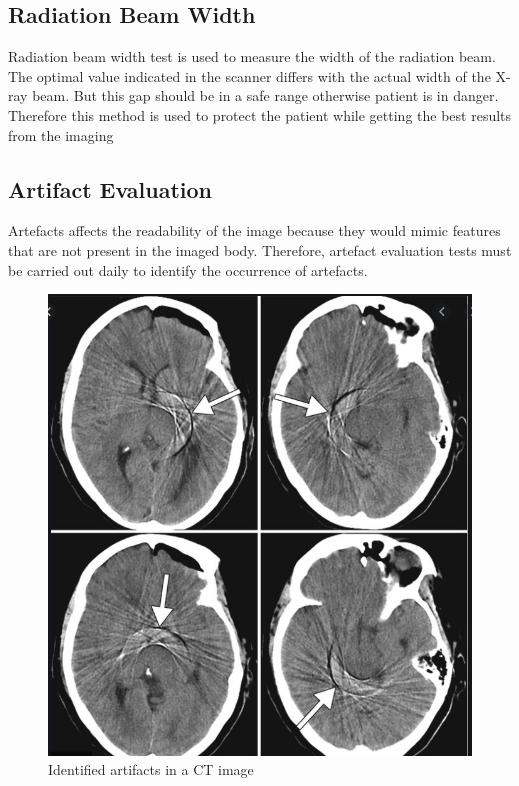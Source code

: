 \documentclass[12pt]{article}
\begin{document}
\subsection{Radiation Beam Width}
Radiation beam width test is used to measure the width of the radiation beam. The optimal value indicated in the scanner differs with the actual width of the X-ray beam. But this gap should be in a safe range otherwise patient is in danger. Therefore this method is used to protect the patient while getting the best results from the imaging

\subsection{Artifact Evaluation}
Artefacts affects the readability of  the image because they would mimic features that are not present in the imaged body. Therefore, artefact evaluation tests must be carried out daily to identify the occurrence of artefacts.

\begin{figure}[h!]
  \centering
  \includegraphics[width=0.75\linewidth]{ar.jpg}
  \caption{\small{Identified artifacts in a CT image}}
  \label{fig:Identified artifacts in a CT image}
\end{figure}

\end{document}
